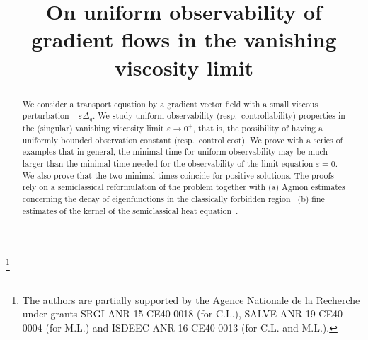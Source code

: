 \documentclass[JEP,XML,SOM,Unicode]{cedram}
\theoremstyle{definition}
\begin{document}
\frontmatter

\title{On uniform observability of gradient flows in the vanishing viscosity limit}

\author[\initial{C.} \lastname{Laurent}]{ }
\address{CNRS UMR 7598 and Sorbonne Universités UPMC Univ Paris 06, Laboratoire Jacques-Louis Lions\\
F-75005, Paris, France}

\author[\initial{M.} \lastname{Léautaud}]{ }
\address{Laboratoire de Mathématiques d'Orsay, Université Paris-Sud, CNRS, Université Paris-Saclay\\
Bâtiment 307, 91405 Orsay Cedex France}

\thanks{The authors are partially supported by the Agence Nationale de la Recherche under grants SRGI ANR-15-CE40-0018 (for C.L.), SALVE ANR-19-CE40-0004 (for M.L.) and ISDEEC ANR-16-CE40-0013 (for C.L. and M.L.).}

\begin{abstract}
We consider a transport equation by a gradient vector field with a small viscous perturbation $-\varepsilon\Delta_g$. We study uniform observability (resp.\ controllability) properties in the (singular) vanishing viscosity limit $\varepsilon\to 0^+$, that is, the possibility of having a uniformly bounded observation constant (resp.\ control cost). We prove with a series of examples that in general, the minimal time for uniform observability may be much larger than the minimal time needed for the observability of the limit equation $\varepsilon=0$. We also prove that the two minimal times coincide for positive solutions. The proofs rely on a semiclassical reformulation of the problem together with (a) Agmon estimates concerning the decay of eigenfunctions in the classically forbidden region~ (b) fine estimates of the kernel of the semiclassical heat equation~.
\end{abstract}



\end{document}
